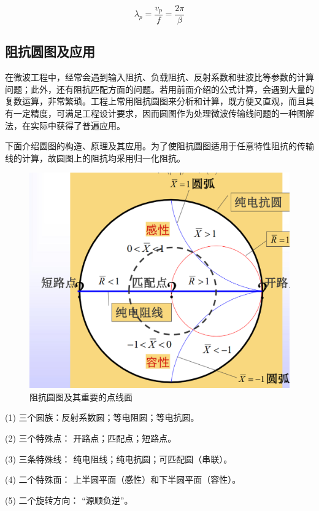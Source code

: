 \[
\lambda_p = \frac{v_p}{f} = \frac{2\pi}{\beta}
\]


\subsection{阻抗圆图及应用}
在微波工程中，经常会遇到输入阻抗、负载阻抗、反射系数和驻波比等参数的计算问题；此外，还有阻抗匹配方面的问题。若用前面介绍的公式计算，会遇到大量的复数运算，非常繁琐。工程上常用阻抗圆图来分析和计算，既方便又直观，而且具有一定精度，可满足工程设计要求，因而圆图作为处理微波传输线问题的一种图解法，在实际中获得了普遍应用。

下面介绍圆图的构造、原理及其应用。为了使阻抗圆图适用于任意特性阻抗的传输线的计算，故圆图上的阻抗均采用归一化阻抗。

\begin{figure}[htbp]
	\centering
	\includegraphics[width=0.5\linewidth]{img/2-4}
	\caption{阻抗圆图及其重要的点线面}
	\label{fig:2-4}
\end{figure}

(1) 三个圆族：反射系数圆；等电阻圆；等电抗圆。

(2) 三个特殊点：
开路点；匹配点；短路点。

(3) 三条特殊线：
纯电阻线；纯电抗圆；可匹配圆（串联）。

(4) 二个特殊面：
上半圆平面（感性）和下半圆平面（容性）。

(5) 二个旋转方向：
“源顺负逆”。
